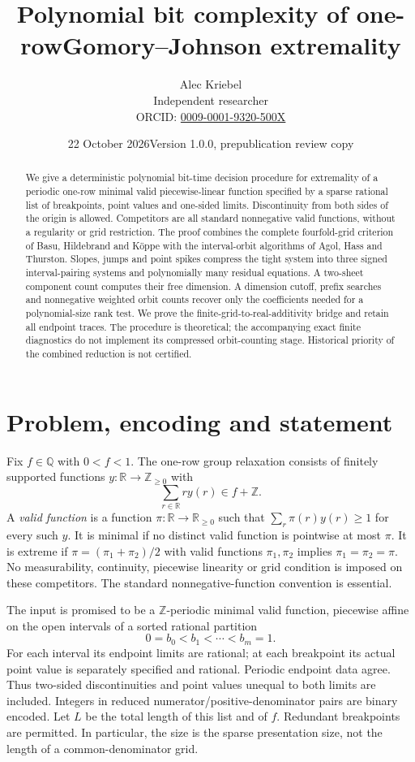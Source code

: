 \documentclass[11pt]{article}
\title{Polynomial bit complexity of one-row\newline Gomory--Johnson extremality}
\author{Alec Kriebel\\Independent researcher\\
\small ORCID: \href{https://orcid.org/0009-0001-9320-500X}{0009-0001-9320-500X}}
\date{22 October 2026\quad Version 1.0.0, prepublication review copy}
\newcommand{\R}{\mathbb R}\newcommand{\Q}{\mathbb Q}\newcommand{\Z}{\mathbb Z}
\begin{document}
\maketitle
\begin{abstract}
We give a deterministic polynomial bit-time decision procedure for extremality of a periodic one-row minimal valid piecewise-linear function specified by a sparse rational list of breakpoints, point values and one-sided limits. Discontinuity from both sides of the origin is allowed. Competitors are all standard nonnegative valid functions, without a regularity or grid restriction. The proof combines the complete fourfold-grid criterion of Basu, Hildebrand and K\"oppe with the interval-orbit algorithms of Agol, Hass and Thurston. Slopes, jumps and point spikes compress the tight system into three signed interval-pairing systems and polynomially many residual equations. A two-sheet component count computes their free dimension. A dimension cutoff, prefix searches and nonnegative weighted orbit counts recover only the coefficients needed for a polynomial-size rank test. We prove the finite-grid-to-real-additivity bridge and retain all endpoint traces. The procedure is theoretical; the accompanying exact finite diagnostics do not implement its compressed orbit-counting stage. Historical priority of the combined reduction is not certified.
\end{abstract}

\section{Problem, encoding and statement}
Fix $f\in\Q$ with $0<f<1$. The one-row group relaxation consists of finitely supported functions $y:\R\to\Z_{\geq0}$ with
\[
 \sum_{r\in\R}r y(r)\in f+\Z.
\]
A \emph{valid function} is a function $\pi:\R\to\R_{\geq0}$ such that $\sum_r\pi(r)y(r)\geq1$ for every such $y$. It is minimal if no distinct valid function is pointwise at most $\pi$. It is extreme if $\pi=(\pi_1+\pi_2)/2$ with valid functions $\pi_1,\pi_2$ implies $\pi_1=\pi_2=\pi$. No measurability, continuity, piecewise linearity or grid condition is imposed on these competitors. The standard nonnegative-function convention is essential.

The input is promised to be a $\Z$-periodic minimal valid function, piecewise affine on the open intervals of a sorted rational partition
\[
 0=b_0<b_1<\cdots<b_m=1.
\]
For each interval its endpoint limits are rational; at each breakpoint its actual point value is separately specified and rational. Periodic endpoint data agree. Thus two-sided discontinuities and point values unequal to both limits are included. Integers in reduced numerator/positive-denominator pairs are binary encoded. Let $L$ be the total length of this list and of $f$. Redundant breakpoints are permitted. In particular, the size is the sparse presentation size, not the length of a common-denominator grid.
\end{document}
